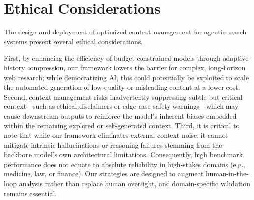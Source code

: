 \section*{Ethical Considerations}
The design and deployment of optimized context management for agentic search systems present several ethical considerations. 

First, by enhancing the efficiency of budget-constrained models through adaptive history compression, our framework lowers the barrier for complex, long-horizon web research; while democratizing AI, this could potentially be exploited to scale the automated generation of low-quality or misleading content at a lower cost. 
Second, context management risks inadvertently suppressing subtle but critical context—such as ethical disclaimers or edge-case safety warnings—which may cause downstream outputs to reinforce the model's inherent biases embedded within the remaining explored or self-generated context. 
Third, it is critical to note that while our framework eliminates external context noise, it cannot mitigate intrinsic hallucinations or reasoning failures stemming from the backbone model's own architectural limitations. 
Consequently, high benchmark performance does not equate to absolute reliability in high-stakes domains (e.g., medicine, law, or finance). Our strategies are designed to augment human-in-the-loop analysis rather than replace human oversight, and domain-specific validation remains essential.